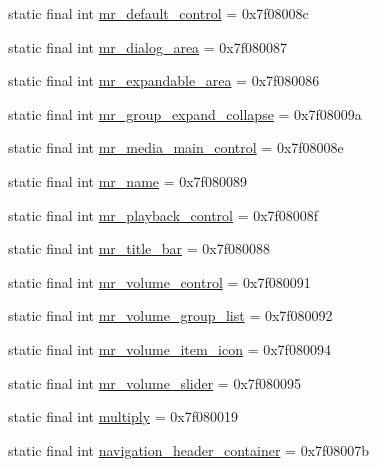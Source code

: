 \begin{CompactItemize}
static final int \hyperlink{classandroid_1_1support_1_1mediacompat_1_1_r_1_1id_9ee7c42e9f6acb17f3919396d47972fe}{mr\_\-default\_\-control} = 0x7f08008c
\item 
static final int \hyperlink{classandroid_1_1support_1_1mediacompat_1_1_r_1_1id_251b8e9da9188439ec7f0e6a579d1d15}{mr\_\-dialog\_\-area} = 0x7f080087
\item 
static final int \hyperlink{classandroid_1_1support_1_1mediacompat_1_1_r_1_1id_633ab700983aee8ff34891cb3e79d6cc}{mr\_\-expandable\_\-area} = 0x7f080086
\item 
static final int \hyperlink{classandroid_1_1support_1_1mediacompat_1_1_r_1_1id_129bf1e256acb19feaadd0a02132823a}{mr\_\-group\_\-expand\_\-collapse} = 0x7f08009a
\item 
static final int \hyperlink{classandroid_1_1support_1_1mediacompat_1_1_r_1_1id_51d6c81374a0602c4fa1ff7127687262}{mr\_\-media\_\-main\_\-control} = 0x7f08008e
\item 
static final int \hyperlink{classandroid_1_1support_1_1mediacompat_1_1_r_1_1id_971470d4a0396de33a9f1b6c7065e99d}{mr\_\-name} = 0x7f080089
\item 
static final int \hyperlink{classandroid_1_1support_1_1mediacompat_1_1_r_1_1id_a502a00683fef5790ced274a5dbcfcde}{mr\_\-playback\_\-control} = 0x7f08008f
\item 
static final int \hyperlink{classandroid_1_1support_1_1mediacompat_1_1_r_1_1id_a1adbaff394dedae6354d525e3246ac9}{mr\_\-title\_\-bar} = 0x7f080088
\item 
static final int \hyperlink{classandroid_1_1support_1_1mediacompat_1_1_r_1_1id_29bcb34eea9702c796e87ac0e7b7ca17}{mr\_\-volume\_\-control} = 0x7f080091
\item 
static final int \hyperlink{classandroid_1_1support_1_1mediacompat_1_1_r_1_1id_1469d610ea2d9f897bf1ca2dc9902b0d}{mr\_\-volume\_\-group\_\-list} = 0x7f080092
\item 
static final int \hyperlink{classandroid_1_1support_1_1mediacompat_1_1_r_1_1id_1f7427293cb57619fe1014b4ea2f5d3e}{mr\_\-volume\_\-item\_\-icon} = 0x7f080094
\item 
static final int \hyperlink{classandroid_1_1support_1_1mediacompat_1_1_r_1_1id_d060246fac8a6e932b82db57f276c43f}{mr\_\-volume\_\-slider} = 0x7f080095
\item 
static final int \hyperlink{classandroid_1_1support_1_1mediacompat_1_1_r_1_1id_5100ec76a740d289e3f2725bb31c4e2a}{multiply} = 0x7f080019
\item 
static final int \hyperlink{classandroid_1_1support_1_1mediacompat_1_1_r_1_1id_e784553f198b1d7c655f4299d48c728e}{navigation\_\-header\_\-container} = 0x7f08007b

\end{CompactItemize}
